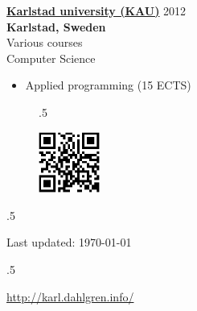 \documentclass[margin]{res}
\begin{document}
\begin{resume}
		    {\bf \href{http://www.umu.se/}{Karlstad university (KAU)}} \hfill 2012 \\
			{\bf Karlstad, Sweden} \\
			Various courses \\
			Computer Science \\
			\begin{itemize}  \itemsep -2pt %
		       	\item Applied programming (15 ECTS)
		    \end{itemize}
		    


	
\end{resume}

\vspace{1em}
\null
\vfill
    \begin{figure}[h]
        		\moveleft.5\hoffset\centerline{\includegraphics[width=2cm]{../image/qr.png}}
    \end{figure}
\moveleft.5\hoffset\centerline{\small{ Last updated: \today }}
\moveleft.5\hoffset\centerline{\small{\url{http://karl.dahlgren.info/}}
}
\end{document}
